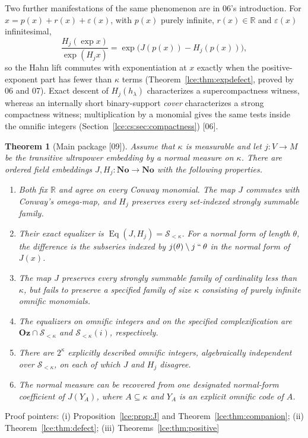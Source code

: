 \documentclass[11pt,letterpaper]{article}
\numberwithin{equation}{section}
\newtheorem{theorem}{Theorem}[section]
\theoremstyle{definition}
\theoremstyle{remark}
\newcommand{\No}{\mathbf{No}}
\newcommand{\Oz}{\mathbf{Oz}}
\newcommand{\R}{\mathbb R}
\newcommand{\Sk}{\mathscr S_{<\kappa}}
\newcommand{\eps}{\varepsilon}
\newcommand{\imset}[2]{#1\mathbin{``}#2}
\newcommand{\thref}[1]{Theorem~\ref{#1}}
\newcommand{\prref}[1]{Proposition~\ref{#1}}
\newcommand{\src}[1]{\textup{\textsf{\small[#1]}}}%
\newcommand{\Eq}{\operatorname{Eq}}
\begin{document}
Two further manifestations of the same phenomenon are in 06's
introduction. For $x=p(x)+r(x)+\eps(x)$, with $p(x)$ purely infinite,
$r(x)\in\R$ and $\eps(x)$ infinitesimal,
\[
 \frac{H_j(\exp x)}{\exp(H_j x)}=\exp\bigl(J(p(x))-H_j(p(x))\bigr),
\]
so the Hahn lift commutes with exponentiation at $x$ exactly when the
positive-exponent part has fewer than $\kappa$ terms
(\thref{lce:thm:expdefect}, proved by 06 and 07). Exact descent of
$H_j(h_\lambda)$ characterizes a supercompactness witness, whereas an
internally short binary-support \emph{cover} characterizes a strong
compactness witness; multiplication by a monomial gives the same tests
inside the omnific integers (Section~\ref{lce:cs:sec:compactness}) \src{06}.

\begin{theorem}[Main package \src{09}]\label{lce:sg:thm:package}
Assume that $\kappa$ is measurable and let $j:V\to M$ be the transitive
ultrapower embedding by a normal measure on $\kappa$. There are ordered
field embeddings $J,H_j:\No\to\No$ with the following properties.
\begin{enumerate}[label=\textup{(\roman*)}]
\item Both fix $\R$ and agree on every Conway monomial. The map $J$
commutes with Conway's omega-map, and $H_j$ preserves every set-indexed
strongly summable family.
\item Their exact equalizer is $\Eq(J,H_j)=\Sk$. For a normal form of length
$\theta$, the difference is the subseries indexed by
$j(\theta)\setminus\imset j\theta$ in the normal form of $J(x)$.
\item The map $J$ preserves every strongly summable family of cardinality
less than $\kappa$, but fails to preserve a specified family of size
$\kappa$ consisting of purely infinite omnific monomials.
\item The equalizers on omnific integers and on the specified
complexification are $\Oz\cap\Sk$ and $\Sk(i)$, respectively.
\item There are $2^\kappa$ explicitly described omnific integers,
algebraically independent over $\Sk$, on each of which $J$ and $H_j$
disagree.
\item The normal measure can be recovered from one designated normal-form
coefficient of $J(Y_A)$, where $A\subseteq\kappa$ and $Y_A$ is an explicit
omnific code of $A$.
\end{enumerate}
\end{theorem}
Proof pointers: (i) \prref{lce:prop:J} and \thref{lce:thm:companion};
(ii) \thref{lce:thm:defect}; (iii) Theorems~\ref{lce:thm:positive}
\end{document}
